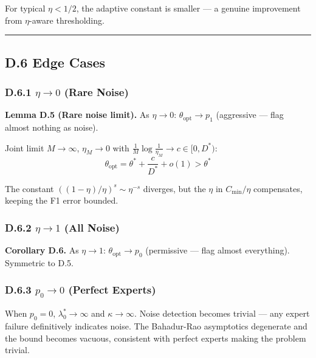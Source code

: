 \documentclass[
  12pt,
]{ctexart}
\begin{document}
For typical \(\eta < 1/2\), the adaptive constant is smaller --- a
genuine improvement from \(\eta\)-aware thresholding.

\begin{center}\rule{0.5\linewidth}{0.5pt}\end{center}

\subsection{D.6 Edge Cases}\label{d.6-edge-cases}

\subsubsection{\texorpdfstring{D.6.1 \(\eta \to 0\) (Rare
Noise)}{D.6.1 \textbackslash eta \textbackslash to 0 (Rare Noise)}}\label{d.6.1-eta-to-0-rare-noise}

\textbf{Lemma D.5 (Rare noise limit).} As \(\eta \to 0\):
\(\theta_{\text{opt}} \to p_1\) (aggressive --- flag almost nothing as
noise).

Joint limit \(M\to\infty\), \(\eta_M \to 0\) with
\(\frac{1}{M}\log\frac{1}{\eta_M} \to c \in [0, D^*)\):
\[\theta_{\text{opt}} = \theta^* + \frac{c}{D^*} + o(1) > \theta^*\]

The constant \(((1-\eta)/\eta)^s \sim \eta^{-s}\) diverges, but the
\(\eta\) in \(C_{\min}/\eta\) compensates, keeping the F1 error bounded.

\subsubsection{\texorpdfstring{D.6.2 \(\eta \to 1\) (All
Noise)}{D.6.2 \textbackslash eta \textbackslash to 1 (All Noise)}}\label{d.6.2-eta-to-1-all-noise}

\textbf{Corollary D.6.} As \(\eta \to 1\):
\(\theta_{\text{opt}} \to p_0\) (permissive --- flag almost everything).
Symmetric to D.5.

\subsubsection{\texorpdfstring{D.6.3 \(p_0 \to 0\) (Perfect
Experts)}{D.6.3 p\_0 \textbackslash to 0 (Perfect Experts)}}\label{d.6.3-p_0-to-0-perfect-experts}

When \(p_0 = 0\), \(\lambda_0^* \to \infty\) and \(\kappa \to \infty\).
Noise detection becomes trivial --- any expert failure definitively
indicates noise. The Bahadur-Rao asymptotics degenerate and the bound
becomes vacuous, consistent with perfect experts making the problem
trivial.
\end{document}
